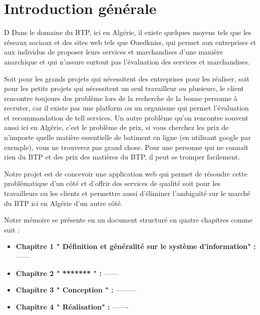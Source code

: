 \chapter*{Introduction générale}
D
Dans le domaine du BTP, ici en Algérie, il existe quelques moyens tels que les
réseaux sociaux et des sites web tels que Ouedkniss, qui permet aux entreprises
et aux individus de proposer leurs services et marchandises d’une manière
anarchique et qui n’assure surtout pas l'évaluation des services et
marchandises.
\\

\par Soit pour les grands projets qui nécessitent des entreprises pour les
réaliser, soit pour les petits projets qui nécessitent un seul travailleur ou
plusieurs, le client rencontre toujours des problème lors de la recherche de la
bonne personne à recruter, car il existe pas une platform ou un organisme qui
permet l’évaluation et recommandation de tell services. Un autre problème qu’on
rencontre souvent aussi ici en Algérie, c’est le problème de prix, si vous
cherchez les prix de n'importe quelle matière essentielle de batiment en ligne
(en utilisant google par exemple), vous ne trouverez pas grand chose. Pour une
personne qui ne connaît rien du BTP et des prix des matières du BTP, il peut se
tromper facilement.\\

\par Notre projet est de concevoir une application web qui permet de résoudre
cette problématique d’un côté et d'offrir des services de qualité soit pour les
travailleurs ou les clients et permettre aussi d'éliminer l'ambiguïté sur le
marché du BTP  ici en Algérie d’un autre côté.\\
\newpage
\vspace{0.5cm}
\par Notre mémoire se présente en un document structuré en quatre chapitres
comme suit : 

\begin{itemize}[label=\textbullet]
\item \textbf{Chapitre 1 " Définition et généralité sur le système
d'information" : } ------ \\

\item \textbf{Chapitre 2 " ******* " : } ------\\

\item \textbf{Chapitre 3 " Conception " :} ---------\\  

\item \textbf{Chapitre 4 " Réalisation" : }-------
\end{itemize}

